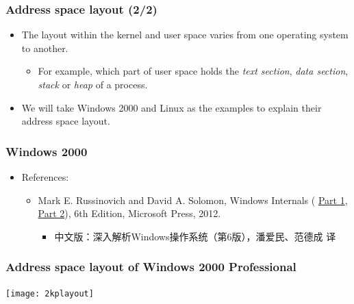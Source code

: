 \documentclass[CJKutf8,dvipsnames,table]{beamer}
\begin{document}
\begin{CJK*}{UTF8}{song}
  
  \begin{frame}
    \frametitle{Address space layout (2/2)} \pause
    \begin{itemize}
    \item The layout within the kernel and user space varies from one operating system to another.  \pause
      \begin{itemize}
      \item For example, which part of user space holds the \emph{text section}, \emph{data section}, \emph{stack} or \emph{heap} of a process.  \pause
      \end{itemize}
    \item We will take Windows 2000 and Linux as the examples to explain their address space layout. 
    \end{itemize}
  \end{frame}
  
  \begin{frame}
    \frametitle{Windows 2000} \pause
    \begin{itemize}
    \item References:  \pause
      \begin{itemize}
          \item{Mark E. Russinovich and David A. Solomon, Windows Internals ( 
\href{https://www.microsoftpressstore.com/store/windows-internals-part-1-9780735648739}{Part 1},
\href{https://www.microsoftpressstore.com/store/windows-internals-part-2-9780735665873}{Part 2}), 6th Edition, Microsoft Press, 2012.} \pause
        \begin{itemize}
        \item 中文版：深入解析Windows操作系统（第6版），潘爱民、范德成 译  \pause
        \end{itemize}
      \end{itemize}
    \end{itemize}
  \end{frame}
  
  \begin{frame}
    \frametitle{Address space layout of Windows 2000 Professional} \pause
    \begin{center}
      \texttt{[image: 2kplayout]}
    \end{center}
  \end{frame}
  

\end{CJK*}
\end{document}
